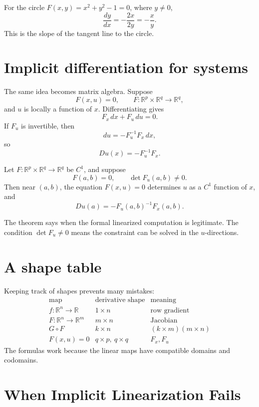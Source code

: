 \begin{example}
For the circle \(F(x,y)=x^2+y^2-1=0\), where \(y\ne0\),
\[
  \frac{dy}{dx}=-\frac{2x}{2y}=-\frac{x}{y}.
\]
This is the slope of the tangent line to the circle.
\end{example}

\section{Implicit differentiation for systems}

The same idea becomes matrix algebra.  Suppose
\[
  F(x,u)=0,\qquad
  F:\mathbb R^p\times\mathbb R^q\to\mathbb R^q,
\]
and \(u\) is locally a function of \(x\).  Differentiating gives
\[
  F_x\,dx+F_u\,du=0.
\]
If \(F_u\) is invertible, then
\[
  du=-F_u^{-1}F_x\,dx,
\]
so
\[
  Du(x)=-F_u^{-1}F_x.
\]

\begin{theorem}
Let \(F:\mathbb R^p\times\mathbb R^q\to\mathbb R^q\) be \(C^1\), and suppose
\[
  F(a,b)=0,\qquad \det F_u(a,b)\ne0.
\]
Then near \((a,b)\), the equation \(F(x,u)=0\) determines \(u\) as a \(C^1\) function of \(x\), and
\[
  Du(a)=-F_u(a,b)^{-1}F_x(a,b).
\]
\end{theorem}

The theorem says when the formal linearized computation is legitimate.  The condition \(\det F_u\ne0\) means the constraint can be solved in the \(u\)-directions.

\section{A shape table}

Keeping track of shapes prevents many mistakes:
\[
\begin{array}{c|c|c}
\text{map} & \text{derivative shape} & \text{meaning}\\
\hline
f:\mathbb R^n\to\mathbb R & 1\times n & \text{row gradient}\\
F:\mathbb R^n\to\mathbb R^m & m\times n & \text{Jacobian}\\
G\circ F & k\times n & (k\times m)(m\times n)\\
F(x,u)=0 & q\times p,\ q\times q & F_x,F_u
\end{array}
\]
The formulas work because the linear maps have compatible domains and codomains.

\section{When Implicit Linearization Fails}

